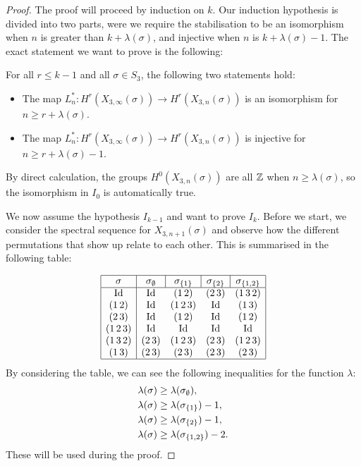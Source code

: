 \begin{proof}
The proof will proceed by induction on $k$. Our induction hypothesis
is divided into two parts, were we require the stabilisation to be an
isomorphism when $n$ is greater than $k+\lambda(\sigma)$, and
injective when $n$ is $k+\lambda(\sigma)-1$. The exact statement we
want to prove is the following:
\begin{hypothesis}[$I_{k-1}$]
  For all $r \leq k-1$ and all $\sigma \in S_3$, the following two
  statements hold:
  \begin{itemize}
  \item The map $L_{n}^* : H^r(X_{3,\infty}(\sigma)) \to
    H^r(X_{3,n}(\sigma))$ is an isomorphism for $n \geq r +
    \lambda(\sigma)$.
  \item The map $L_{n}^* : H^r(X_{3,\infty}(\sigma)) \to
    H^r(X_{3,n}(\sigma))$ is injective for $n \geq r +\lambda(\sigma)
    -1$.
  \end{itemize}
\end{hypothesis}

By direct calculation, the
groups $H^0(X_{3,n}(\sigma))$ are all $\mathbb{Z}$ when $n \geq
\lambda(\sigma)$, so the isomorphism in $I_0$ is automatically
true. 

We now assume the hypothesis $I_{k-1}$ and want to prove $I_k$. Before
we start, we consider the spectral sequence for $X_{3,n+1}(\sigma)$
and observe how the different permutations that show up relate to each
other. This is summarised in the following table:

\[
\begin{array}{|c|cccc|}
  \hline
  \sigma & \multicolumn{1}{c|}{\sigma_\emptyset} 
  & \multicolumn{1}{c|}{\sigma_{\set{1}}} 
  & \multicolumn{1}{c|}{\sigma_{\set{2}}} & \sigma_{\set{1,2}} \\
  \hline
  \Id & \Id & (1\,2) & (2\,3) & (1\,3\,2) \\
  (1\,2) & \Id & (1\,2\,3) & \Id & (1\,3) \\
  (2\,3) & \Id & (1\,2) & \Id & (1\,2) \\
  (1\,2\,3) & \Id & \Id & \Id & \Id \\
  (1\,3\,2) & (2\,3) & (1\,2\,3) & (2\,3) & (1\,2\,3) \\
  (1\,3) & (2\, 3) & (2\,3) & (2\,3) & (2\,3) \\
  \hline
\end{array}
\] 
By considering the table, we can see the following inequalities for
the function $\lambda$:
\begin{align*}
  \lambda(\sigma) &\geq \lambda(\sigma_{\emptyset}), \\
  \lambda(\sigma) &\geq \lambda(\sigma_{\left\{ 1 \right\}}) - 1, \\
  \lambda(\sigma) &\geq \lambda(\sigma_{\left\{ 2 \right\}}) - 1, \\
  \lambda(\sigma) &\geq \lambda(\sigma_{\left\{ 1,2 \right\}}) - 2. \\
\end{align*}
These will be used during the proof.


\end{proof}
